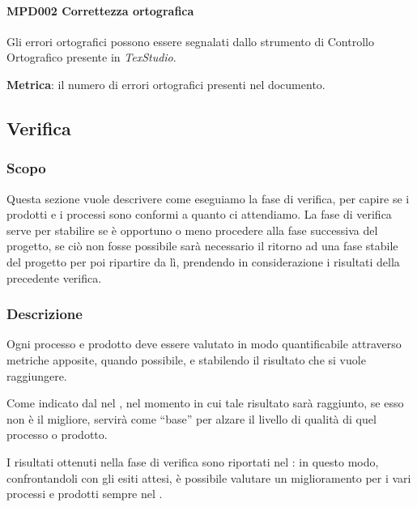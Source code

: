 			\paragraph{MPD002 Correttezza ortografica}
			Gli errori ortografici possono essere segnalati dallo strumento di Controllo Ortografico presente in \textit{TexStudio}.

			\textbf{Metrica}: il numero di errori ortografici presenti nel documento.

	\subsection{Verifica}

		\subsubsection{Scopo}
		Questa sezione vuole descrivere come eseguiamo la fase di verifica, per capire se i prodotti e i processi sono conformi a quanto ci attendiamo.
		La fase di verifica serve per stabilire se è opportuno o meno procedere alla fase successiva del progetto, se ciò non fosse possibile sarà necessario il
		ritorno ad una fase stabile del progetto per poi ripartire da lì, prendendo in considerazione i risultati della precedente verifica.


		\subsubsection{Descrizione}
		Ogni processo e prodotto deve essere valutato in modo quantificabile attraverso metriche apposite, quando possibile, e stabilendo il risultato che si vuole
		raggiungere.

		Come indicato dal  nel \Doc{\PdQv}, nel momento in cui tale risultato sarà raggiunto, se esso non è il migliore,
		servirà come ``base'' per alzare il livello di qualità di quel processo o prodotto.

		I risultati ottenuti nella fase di verifica sono riportati nel \PdQ: in questo modo, confrontandoli con gli esiti attesi,
		è possibile valutare un miglioramento per i vari processi e prodotti sempre nel \PdQ.

